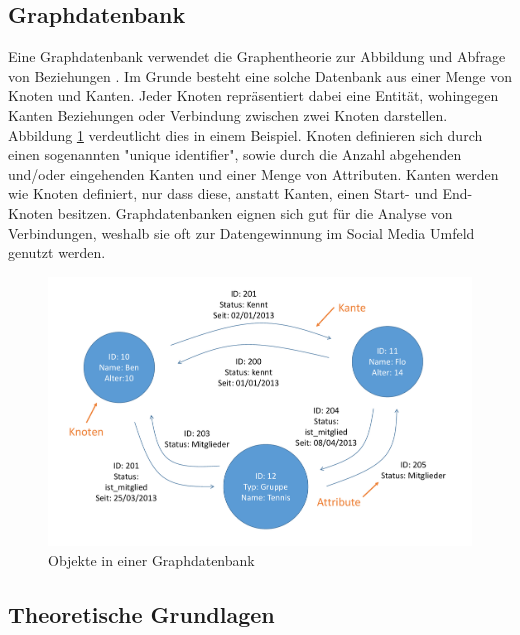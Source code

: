 \subsection{Graphdatenbank}
\label{ch:grundlagen:sec:NoSQL:GraphDatenbanken}

Eine Graphdatenbank verwendet die Graphentheorie zur Abbildung und Abfrage von Beziehungen \cite{SWB-386976589}. Im Grunde besteht eine solche Datenbank aus einer Menge von Knoten und Kanten. Jeder Knoten repräsentiert dabei eine Entität, wohingegen Kanten Beziehungen oder Verbindung zwischen zwei Knoten darstellen. Abbildung \ref{graph_database} verdeutlicht dies in einem Beispiel. Knoten definieren sich durch einen sogenannten "unique identifier", sowie durch die Anzahl abgehenden und/oder eingehenden Kanten und einer Menge von Attributen. Kanten werden wie Knoten definiert, nur dass diese, anstatt Kanten, einen Start- und End-Knoten besitzen. Graphdatenbanken eignen sich gut für die Analyse von Verbindungen, weshalb sie oft zur Datengewinnung im Social Media Umfeld genutzt werden.

\begin{figure}[htbp]
	\centering
  \includegraphics[width=1.0\textwidth, width=1.0\textwidth]{pics/graphdatabase.pdf}
	\caption{Objekte in einer Graphdatenbank}
	\label{graph_database}
\end{figure}

\subsection{Theoretische Grundlagen}
\label{ch:grundlagen:sec:NoSQL:NoSQLBasics}

